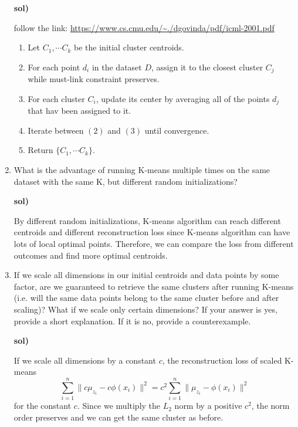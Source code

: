 \documentclass[a4paper]{article}
\begin{document}
\begin{enumerate}[label=\alph*.]
        \medskip \textbf{sol)}

        follow the link: \url{https://www.cs.cmu.edu/~./dgovinda/pdf/icml-2001.pdf}
        
        \begin{enumerate}[label=\arabic*.]
            \item Let $C_1, \cdots C_k$ be the initial cluster centroids. 

            \item For each point $d_i$ in the dataset $D$, assign it to the closest cluster $C_j$ while must-link constraint preserves. 
            
            \item For each cluster $C_i$, update its center by averaging all of the points $d_j$ that hav been assigned to it.
            
            \item Iterate between $(2)$ and $(3)$ until convergence.
            
            \item Return $\{C_1, \cdots C_k\}$.
         
        \end{enumerate}
        
        \item What is the advantage of running K-means multiple times on the same dataset with the same K, but different random initializations?

        \medskip \textbf{sol)}
        
        By different random initializations, K-means algorithm can reach different centroids and different reconstruction loss since K-means algorithm can have lots of local optimal points. 
        Therefore, we can compare the loss from different outcomes and find more optimal centroids.

        \item If we scale all dimensions in our initial centroids and data points by some factor, 
        are we guaranteed to retrieve the same clusters after running K-means 
        (i.e. will the same data points belong to the same cluster before and after scaling)? 
        What if we scale only certain dimensions? If your answer is yes, provide a short explanation. 
        If it is no, provide a counterexample.

        \medskip \textbf{sol)}
        
        If we scale all dimensions by a constant $c$, the reconstruction loss of scaled K-means $$\sum \limits_{i=1}^n \| c\mu_{z_i} - c\phi(x_i) \|^2 = c^2 \sum \limits_{i=1}^n \| \mu_{z_i} - \phi(x_i) \|^2$$ for the constant $c$. 
        Since we multiply the $L_2$ norm by a positive $c^2$, the norm order preserves and we can get the same cluster as before.
        

\end{enumerate}
\end{document}
